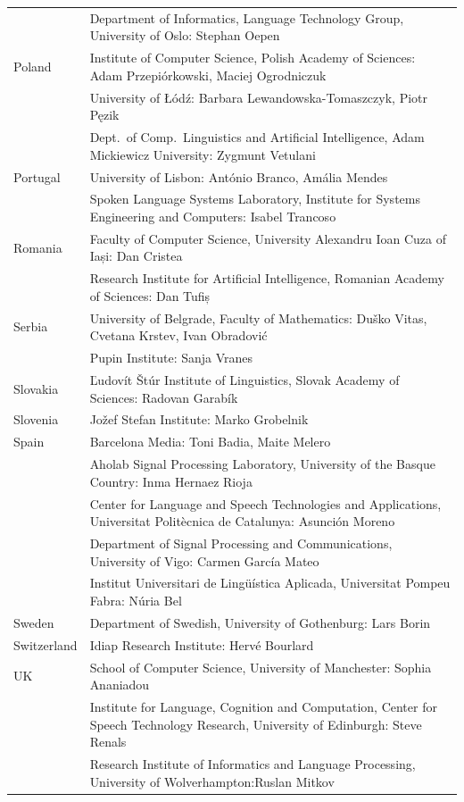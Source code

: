 \begin{longtable}{@{}lp{137mm}@{}}
& Department of Informatics, Language Technology Group, University of Oslo:  Stephan Oepen \\ \addlinespace
Poland & Institute of Computer Science, Polish Academy of Sciences: Adam Przepiórkowski, Maciej Ogrodniczuk \\ \addlinespace
& University of Łódź: Barbara Lewandowska-Tomaszczyk, Piotr Pęzik\\ \addlinespace
& Dept.~of Comp.~Linguistics and Artificial Intelligence, Adam Mickiewicz University: Zygmunt Vetulani \\ \addlinespace
Portugal & University of Lisbon: António Branco, Amália Mendes \\ \addlinespace 
& Spoken Language Systems Laboratory, Institute for Systems Engineering and Computers: Isabel Trancoso \\ \addlinespace
Romania & Faculty of Computer Science, University Alexandru Ioan Cuza of Iași: Dan Cristea \\ \addlinespace
& Research Institute for Artificial Intelligence, Romanian Academy of Sciences:  Dan Tufiș \\ \addlinespace
Serbia  & University of Belgrade, Faculty of Mathematics: Duško Vitas, Cvetana Krstev,  Ivan Obradović \\ \addlinespace
& Pupin Institute: Sanja Vranes \\ \addlinespace  
Slovakia & Ľudovít Štúr Institute of Linguistics, Slovak Academy of Sciences: Radovan Garabík \\ \addlinespace 
Slovenia & Jožef Stefan Institute: Marko Grobelnik \\ \addlinespace 
Spain & Barcelona Media: Toni Badia, Maite Melero \\ \addlinespace  
& Aholab Signal Processing Laboratory, University of the Basque Country:  Inma Hernaez Rioja \\ \addlinespace 
& Center for Language and Speech Technologies and Applications, Universitat Politècnica de Catalunya:  Asunción Moreno \\ \addlinespace 
& Department of Signal Processing and Communications, University of Vigo:  Carmen García Mateo \\ \addlinespace 
& Institut Universitari de Lingüística Aplicada, Universitat Pompeu Fabra: Núria Bel \\ \addlinespace 
Sweden & Department of Swedish, University of Gothenburg: Lars Borin \\ \addlinespace 
Switzerland & Idiap Research Institute: Hervé Bourlard \\ \addlinespace 
UK & School of Computer Science, University of Manchester: Sophia Ananiadou \\ \addlinespace  & Institute for Language, Cognition and Computation, Center for Speech Technology Research, University of Edinburgh: Steve Renals \\ \addlinespace 
& Research Institute of Informatics and Language Processing, University of Wolverhampton:\newline Ruslan Mitkov \\ 
\end{longtable}
\normalsize


